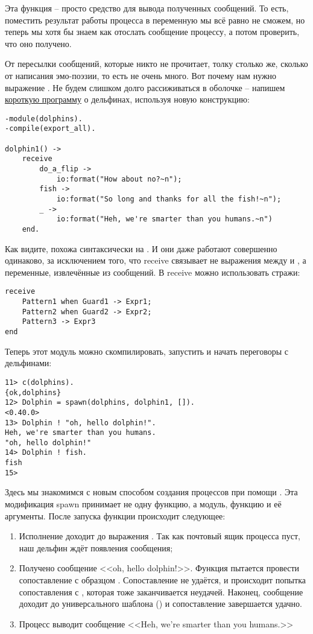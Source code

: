 Эта функция \--- просто средство для вывода полученных сообщений.
То есть, поместить результат работы процесса в переменную мы всё равно не сможем, но теперь мы хотя бы знаем как отослать сообщение процессу, а потом проверить, что оно получено.

От пересылки сообщений, которые никто не прочитает, толку столько же, сколько от написания эмо\--поэзии, то есть не очень много.
Вот почему нам нужно выражение .
Не будем слишком долго рассиживаться в оболочке \--- напишем  \href{http://learnyousomeerlang.com/static/erlang/dolphins.erl}{короткую программу} о дельфинах, используя новую конструкцию:
\begin{lstlisting}[style=erlang]
-module(dolphins).
-compile(export_all).
 
dolphin1() ->
    receive
        do_a_flip ->
            io:format("How about no?~n");
        fish ->
            io:format("So long and thanks for all the fish!~n");
        _ ->
            io:format("Heh, we're smarter than you humans.~n")
    end.
\end{lstlisting}

Как видите,  похожа синтаксически на .
И они даже работают совершенно одинаково, за исключением того, что receive связывает не выражения между  и , а переменные, извлечённые из сообщений.
В receive можно использовать стражи:
\begin{lstlisting}[style=erlang]
receive
    Pattern1 when Guard1 -> Expr1;
    Pattern2 when Guard2 -> Expr2;
    Pattern3 -> Expr3
end
\end{lstlisting}

Теперь этот модуль можно скомпилировать, запустить и начать переговоры с дельфинами:
\begin{lstlisting}[style=erlang]
11> c(dolphins).
{ok,dolphins}
12> Dolphin = spawn(dolphins, dolphin1, []).
<0.40.0>
13> Dolphin ! "oh, hello dolphin!".
Heh, we're smarter than you humans.
"oh, hello dolphin!"
14> Dolphin ! fish.               
fish
15>
\end{lstlisting}

Здесь мы знакомимся с новым способом создания процессов при помощи .
Эта модификация spawn принимает не одну функцию, а модуль, функцию и её аргументы.
После запуска функции происходит следующее:
\begin{enumerate}
    \item Исполнение доходит до выражения .
Так как почтовый ящик процесса пуст, наш дельфин ждёт появления сообщения;
\item Получено сообщение <<oh, hello dolphin!>>.
Функция пытается провести сопоставление с образцом .
Сопоставление не удаётся, и происходит попытка сопоставления с , которая тоже заканчивается неудачей.
Наконец, сообщение доходит до универсального шаблона (\ops{\strut\_}) и сопоставление завершается удачно.
\item Процесс выводит сообщение <<Heh, we're smarter than you humans.>>
\end{enumerate}

